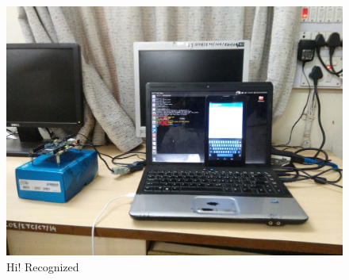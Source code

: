 \documentclass[12pt]{article}
\begin{document}
\begin{figure}[htb]
\centering
\includegraphics[width=\linewidth]{f1.jpg}
\caption{Hi! Recognized}
\label{fig1}
\end{figure}
\end{document}
